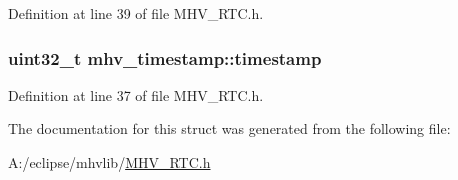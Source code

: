 \-Definition at line 39 of file \-M\-H\-V\-\_\-\-R\-T\-C.\-h.

\hypertarget{structmhv__timestamp_a0f520358e057865fb12a9153cae820c5}{
\subsubsection[{timestamp}]{\setlength{\rightskip}{0pt plus 5cm}uint32\-\_\-t {\bf mhv\-\_\-timestamp\-::timestamp}}}
\label{structmhv__timestamp_a0f520358e057865fb12a9153cae820c5}


\-Definition at line 37 of file \-M\-H\-V\-\_\-\-R\-T\-C.\-h.



\-The documentation for this struct was generated from the following file\-:\begin{DoxyCompactItemize}
\item 
\-A\-:/eclipse/mhvlib/\hyperlink{_m_h_v___r_t_c_8h}{\-M\-H\-V\-\_\-\-R\-T\-C.\-h}\end{DoxyCompactItemize}
